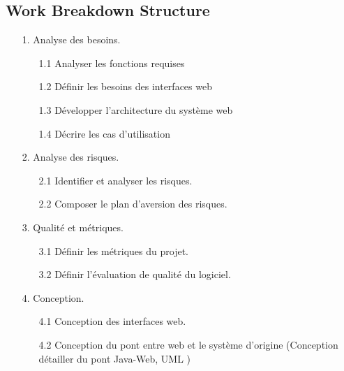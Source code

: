 \documentclass[10pt,a4paper]{report}
\begin{document}
		\begin{flushleft}
				\section*{Work Breakdown Structure}
					\begin{enumerate}
						\item[1.] Analyse des besoins.\\
						\begin{enumerate}
							\item[1.1] Analyser les fonctions requises\\
							\item[1.2] Définir les besoins des interfaces web\\
							\item[1.3] Développer l'architecture du système web\\
							\item[1.4] Décrire les cas d'utilisation\\
						\end{enumerate}
				\item[2.] Analyse des risques.\\
					\begin{enumerate}
						\item[2.1] Identifier et analyser les risques.\\
						\item[2.2] Composer le plan d'aversion des risques.\\
					\end{enumerate}
				\item[3.] Qualité et métriques.\\
					\begin{enumerate}
						\item[3.1] Définir les métriques du projet.\\
						\item[3.2] Définir l'évaluation de qualité du logiciel.\\
					\end{enumerate}
				\item[4.] Conception.\\
					\begin{enumerate}
						\item[4.1] Conception des interfaces web.\\
						\item[4.2] Conception du pont entre web et le système d'origine (Conception détailler du pont Java-Web, UML )\\

\end{enumerate}
\end{enumerate}
\end{flushleft}
\end{document}
